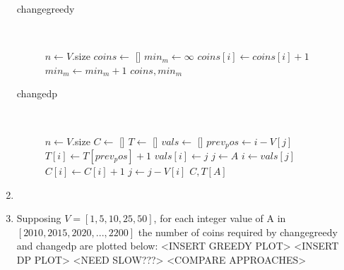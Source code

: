 \documentclass[paper=a4, fontsize=11pt]{scrartcl} %
\numberwithin{equation}{section} %
\numberwithin{figure}{section} %
\numberwithin{table}{section} %
\begin{document}
\begin{enumerate}
\begin{description}
        \item[changegreedy] \hfill \\
        \begin{algorithmic}
                \State $n \gets V$.size
                \State $coins \gets$ []
                \State $min_m \gets \infty$
                        \State $coins[i] \gets coins[i] + 1$
                        \State $min_m \gets min_m + 1$
                    \EndWhile
                \EndFor
                \Return $coins, min_m$
            \EndFunction
        \end{algorithmic}

        \item[changedp] \hfill \\
        \begin{algorithmic}
                \State $n \gets V$.size
                \State $C \gets$ []
                \State $T \gets$ []
                \State $vals \gets$ []
                        \State $prev_pos \gets i - V[j]$
                                \State $T[i] \gets T[prev_pos] + 1$
                                \State $vals[i] \gets j$
                            \EndIf
                        \EndIf
                    \EndFor
                \EndFor
                \State $j \gets A$
                    \State $i \gets vals[j]$
                    \State $C[i] \gets C[i] + 1$
                    \State $j \gets j - V[i]$
                \EndWhile
                \Return $C, T[A]$
            \EndFunction
        \end{algorithmic}
    \end{description}
    
    \item <Proof of correctness of dynamic programming approach>
    
    \item Supposing $V = [1, 5, 10, 25, 50]$, for each integer value of A in $[2010, 2015, 2020, ..., 2200]$ the number of coins required by changegreedy and changedp are plotted below: <INSERT GREEDY PLOT> <INSERT DP PLOT> <NEED SLOW???> <COMPARE APPROACHES>
    

\end{enumerate}
\end{document}
